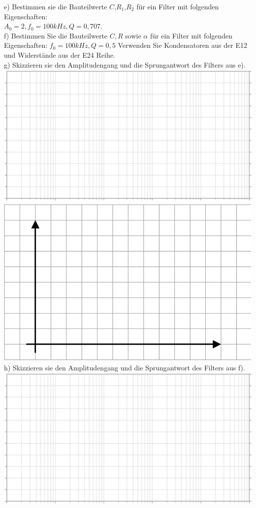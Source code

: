 \documentclass[A4]{scrreprt}
\begin{document}
  e) Bestimmen sie die Bauteilwerte $C$,$R_1$,$R_2$ für ein Filter mit folgenden Eigenschaften:\\
  $A_0 = 2,f_0 = 100kHz, Q=0,707$.\\
  f) Bestimmen Sie die Bauteilwerte $C,R$ sowie $\alpha$ für ein Filter mit folgenden Eigenschaften: 
  $f_0 = 100kHz, Q=0,5$
  Verwenden Sie Kondensatoren aus der E12 und Widerstände aus der E24 Reihe.\\
  g) Skizzieren sie den Amplitudengang und die Sprungantwort des Filters aus e).\\
  \includegraphics{logpaper.png}\\
  \includegraphics{normpaper.png}\\
  h) Skizzieren sie den Amplitudengang und die Sprungantwort des Filters aus f).\\
  \includegraphics{logpaper.png}\\
\end{document}

